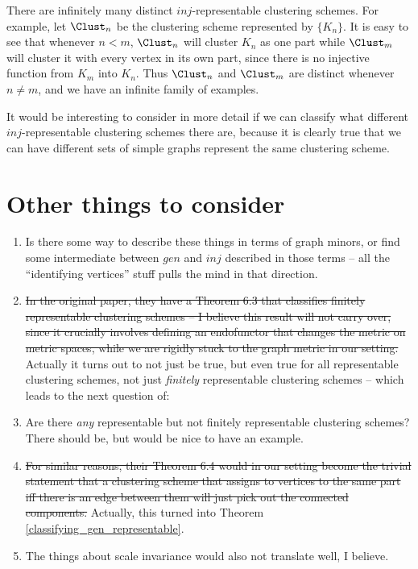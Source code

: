 \documentclass[a4paper,reqno,oneside]{article} %
\begin{document}
\begin{remark}
There are infinitely many distinct $inj$-representable clustering schemes. For example, let $\Clust_n$ be the clustering scheme represented by $\{K_n\}$. It is easy to see that whenever $n < m$, $\Clust_n$ will cluster $K_n$ as one part while $\Clust_m$ will cluster it with every vertex in its own part, since there is no injective function from $K_m$ into $K_n$. Thus $\Clust_n$ and $\Clust_m$ are distinct whenever $n\neq m$, and we have an infinite family of examples.
\end{remark}

It would be interesting to consider in more detail if we can classify what different $inj$-representable clustering schemes there are, because it is clearly true that we can have different sets of simple graphs represent the same clustering scheme.

\section{Other things to consider}

\begin{enumerate}
    \item Is there some way to describe these things in terms of graph minors, or find some intermediate between $gen$ and $inj$ described in those terms -- all the ``identifying vertices'' stuff pulls the mind in that direction. 
    \item \st{In the original paper, they have a Theorem 6.3 that classifies finitely representable clustering schemes -- I believe this result will not carry over, since it crucially involves defining an endofunctor that changes the metric on metric spaces, while we are rigidly stuck to the graph metric in our setting.} Actually it turns out to not just be true, but even true for all representable clustering schemes, not just \emph{finitely} representable clustering schemes -- which leads to the next question of:
    \item Are there \emph{any} representable but not finitely representable clustering schemes? There should be, but would be nice to have an example.
    \item \st{For similar reasons, their Theorem 6.4 would in our setting become the trivial statement that a clustering scheme that assigns to vertices to the same part iff there is an edge between them will just pick out the connected components.} Actually, this turned into Theorem \ref{classifying_gen_representable}.
    \item The things about scale invariance would also not translate well, I believe.
\end{enumerate}
\end{document}
